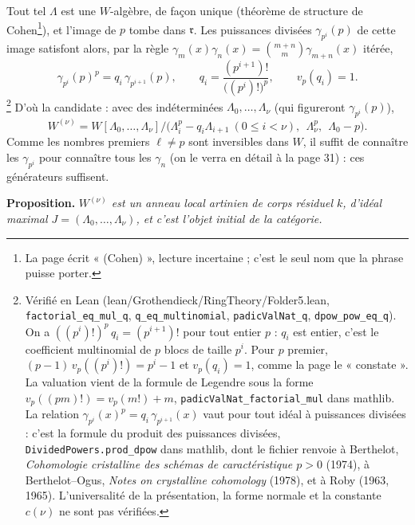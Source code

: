 \documentclass[11pt,a4paper]{article}
\begin{document}
Tout tel $\Lambda$ est une $W$-algèbre, de façon unique (théorème de
structure de Cohen\footnote{La page écrit « (Cohen) », lecture incertaine ;
c'est le seul nom que la phrase puisse porter.}), et l'image de $p$ tombe dans
$\mathfrak{r}$. Les puissances divisées $\gamma_{p^{i}}(p)$ de cette image
satisfont alors, par la règle $\gamma_m(x)\gamma_n(x) = \binom{m+n}{m}
\gamma_{m+n}(x)$ itérée,
\[
\gamma_{p^{i}}(p)^{p} = q_i\, \gamma_{p^{i+1}}(p), \qquad
q_i = \frac{(p^{i+1})!}{\bigl((p^{i})!\bigr)^{p}}, \qquad
v_p(q_i) = 1 .
\]
\footnote{Vérifié en Lean (lean/Grothendieck/RingTheory/Folder5.lean,
\texttt{factorial\_eq\_mul\_q}, \texttt{q\_eq\_multinomial},
\texttt{padicValNat\_q}, \texttt{dpow\_pow\_eq\_q}). On a $((p^{i})!)^{p}\,
q_i = (p^{i+1})!$ pour tout entier $p$ : $q_i$ est entier, c'est le coefficient
multinomial de $p$ blocs de taille $p^{i}$. Pour $p$ premier, $(p - 1)\,
v_p((p^{i})!) = p^{i} - 1$ et $v_p(q_i) = 1$, comme la page le « constate ».
La valuation vient de la formule de Legendre sous la forme $v_p((pm)!) =
v_p(m!) + m$, \texttt{padicValNat\_factorial\_mul} dans mathlib. La relation
$\gamma_{p^{i}}(x)^{p} = q_i\, \gamma_{p^{i+1}}(x)$ vaut pour tout idéal à
puissances divisées : c'est la formule du produit des puissances divisées,
\texttt{DividedPowers.prod\_dpow} dans mathlib, dont le fichier renvoie à
Berthelot, \emph{Cohomologie cristalline des schémas de caractéristique
$p > 0$} (1974), à Berthelot--Ogus, \emph{Notes on crystalline cohomology}
(1978), et à Roby (1963, 1965). L'universalité de la présentation, la forme
normale et la constante $c(\nu)$ ne sont pas vérifiées.}
D'où la candidate : avec des indéterminées $\Lambda_0, \ldots, \Lambda_\nu$
(qui figureront $\gamma_{p^{i}}(p)$),
\[
W^{(\nu)} = W[\Lambda_0, \ldots, \Lambda_\nu] \big/ \bigl(\Lambda_i^{p} - q_i
\Lambda_{i+1}\ (0 \leqslant i < \nu),\ \ \Lambda_\nu^{p},\ \ \Lambda_0 - p\bigr).
\]
Comme les nombres premiers $\ell \neq p$ sont inversibles dans $W$, il
suffit de connaître les $\gamma_{p^{i}}$ pour connaître tous les $\gamma_n$
(on le verra en détail à la page 31) : ces générateurs suffisent.

\textbf{Proposition.} \emph{$W^{(\nu)}$ est un anneau local artinien de corps
résiduel $k$, d'idéal maximal $J = (\Lambda_0, \ldots, \Lambda_\nu)$, et
c'est l'objet initial de la catégorie.}
\end{document}
